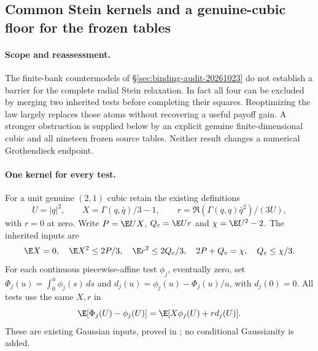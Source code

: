 \subsection{Common Stein kernels and a genuine-cubic floor for the frozen tables}
\label{sec:common-stein-reassessment-20261023}

\paragraph{Scope and reassessment.}
The finite-bank countermodels of \S\ref{sec:binding-audit-20261023} do not
establish a barrier for the complete radial Stein relaxation. In fact all four
can be excluded by merging two inherited tests before completing their squares.
Reoptimizing the law largely replaces those atoms without recovering a useful
payoff gain. A stronger obstruction is supplied below by an explicit genuine
finite-dimensional cubic and all nineteen frozen source tables. Neither result
changes a numerical Grothendieck endpoint.

\paragraph{One kernel for every test.}
For a unit genuine $(2,1)$ cubic retain the existing definitions
\[
 U=|q|^2,\qquad X=\Gamma(q,\bar q)/3-1,\qquad
 r=\Re(\Gamma(q,q)\bar q^2)/(3U),
\]
with $r=0$ at zero. Write $P=\E UX$, $Q_c=\E Ur$ and
$\chi=\E U^2-2$. The inherited inputs are
\[
 \E X=0,\quad \E X^2\le2P/3,\quad \E r^2\le2Q_c/3,
 \quad 2P+Q_c=\chi,\quad Q_c\le\chi/3.
\]
For each continuous piecewise-affine test $\phi_j$, eventually zero, set
$\Phi_j(u)=\int_0^u\phi_j(s)\,ds$ and
$d_j(u)=\phi_j(u)-\Phi_j(u)/u$, with $d_j(0)=0$. All tests use the same
$X,r$ in
\[
 \E[\Phi_j(U)-\phi_j(U)]
   =\E[X\phi_j(U)+rd_j(U)].
\]
These are existing Gaussian inputs, proved in
; no conditional Gaussianity is added.

